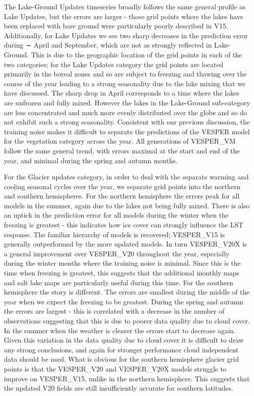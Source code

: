 \documentclass[hess, twostagejnl]{copernicus}
\begin{document}
The Lake-Ground Updates timeseries broadly follows the same general profile as Lake Updates, but the errors are larger - those grid points where the lakes have been replaced with bare ground were particularly poorly described in V15. Additionally, for Lake Updates we see two sharp decreases in the prediction error during ∼ April and September, which are not as strongly reflected in Lake-Ground. This is due to the geographic location of the grid points in each of the two categories; for the Lake Updates category the grid points are located primarily in the boreal zones and so are subject to freezing and thawing over the course of the year leading to a strong seasonality due to the lake mixing that we have discussed. The sharp drop in April corresponds to a time where the lakes are unfrozen and fully mixed. However the lakes in the Lake-Ground sub-category are less concentrated and much more evenly distributed over the globe and so do not exhibit such a strong seasonality. Consistent with our previous discussion, the training noise makes it difficult to separate the predictions of the VESPER model for the vegetation category across the year. All generations of VESPER\_VM follow the same general trend, with errors maximal at the start and end of the year, and minimal during the spring and autumn months. \newline 

For the Glacier updates category, in order to deal with the separate warming and cooling seasonal cycles over the year, we separate grid points into the northern and southern hemispheres. For the northern hemisphere the errors peak for all models in the summer, again due to the lakes not being fully mixed. There is also an uptick in the prediction error for all models during the winter when the freezing is greatest - this indicates how ice cover can strongly influence the LST response. The familiar hierarchy of models is recovered; VESPER\_V15 is generally outperformed by the more updated models. In turn VESPER\_V20X is a general improvement over VESPER\_V20 throughout the year, especially during the winter months where the training noise is minimal. Since this is the time when freezing is greatest, this suggests that the additional monthly maps and salt lake maps are particularly useful during this time. For the southern hemisphere the story is different. The errors are smallest during the middle of the year when we expect the freezing to be greatest. During the spring and autumn the errors are largest - this is correlated with a decrease in the number of observations suggesting that this is due to poorer data quality due to cloud cover. In the summer when the weather is clearer the errors start to decrease again. Given this variation in the data quality due to cloud cover it is difficult to draw any strong conclusions, and again for stronger performance cloud independent data should be used. What is obvious for the southern hemisphere glacier grid points is that the VESPER\_V20 and VESPER\_V20X models struggle to improve on VESPER\_V15, unlike in the northern hemisphere. This suggests that the updated V20 fields are still insufficiently accurate for southern latitudes. \newline 
\end{document}
